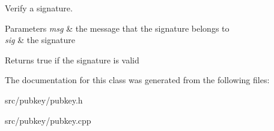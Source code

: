 Verify a signature. 
\begin{DoxyParams}{Parameters}
{\em msg} & the message that the signature belongs to \\
\hline
{\em sig} & the signature \\
\hline
\end{DoxyParams}
\begin{DoxyReturn}{Returns}
true if the signature is valid 
\end{DoxyReturn}


The documentation for this class was generated from the following files\-:\begin{DoxyCompactItemize}
\item 
src/pubkey/pubkey.\-h\item 
src/pubkey/pubkey.\-cpp\end{DoxyCompactItemize}
